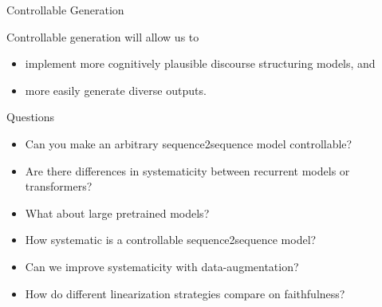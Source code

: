 \begin{frame}{Controllable Generation}


    Controllable generation will allow us to 
    \begin{itemize}
        \item implement more cognitively plausible
    discourse structuring models, and 
\item more easily generate diverse outputs.
    \end{itemize}
    


\end{frame}


\begin{frame}{Questions}
\begin{itemize}
\item Can you make an arbitrary sequence2sequence model controllable?
\item Are there differences in systematicity between recurrent models or
transformers?
\item What about large pretrained models?
\item How systematic is a controllable sequence2sequence model?
\item Can we improve systematicity with data-augmentation?
\item How do different linearization strategies compare on faithfulness?
\end{itemize}
\end{frame}
